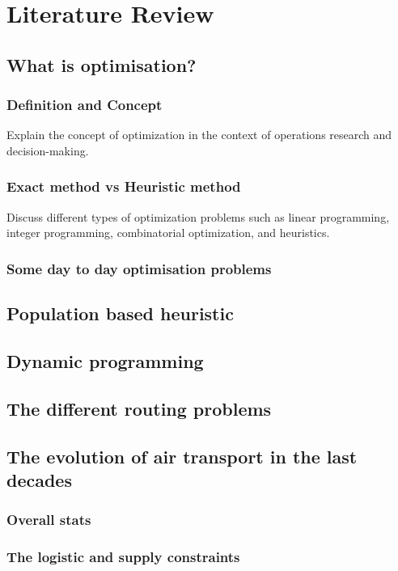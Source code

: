 \chapter{Literature Review}
\label{Chapter2}

\section{What is optimisation?}
\subsection{Definition and Concept}
Explain the concept of optimization in the context of operations research and decision-making.

\subsection{Exact method vs Heuristic method}
Discuss different types of optimization problems such as linear programming, integer programming, combinatorial optimization, and heuristics.
\subsection{Some day to day optimisation problems}

\section{Population based heuristic}
\section{Dynamic programming}

\section{The different routing problems}

\section{The evolution of air transport in the last decades}
\subsection{Overall stats}
\subsection{The logistic and supply constraints}
